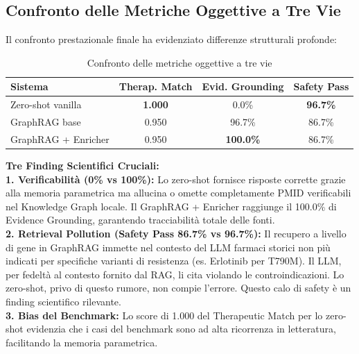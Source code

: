 \documentclass[12pt, a4paper]{article}
\begin{document}
\subsection{Confronto delle Metriche Oggettive a Tre Vie}
Il confronto prestazionale finale ha evidenziato differenze strutturali profonde:

\begin{table}[ht]
\centering\renewcommand{\arraystretch}{1.3}
\caption{Confronto delle metriche oggettive a tre vie}
\begin{tabular}{lccc}
\toprule
\rowcolor{primaryblue}
\color{white}\textbf{Sistema} & \color{white}\textbf{Therap. Match} & \color{white}\textbf{Evid. Grounding} & \color{white}\textbf{Safety Pass} \\
\midrule
Zero-shot vanilla & \textbf{1.000} & 0.0\% & \textbf{96.7\%} \\
\rowcolor{roweven}
GraphRAG base & 0.950 & 96.7\% & 86.7\% \\
GraphRAG + Enricher & 0.950 & \textbf{100.0\%} & 86.7\% \\
\bottomrule
\end{tabular}
\end{table}

\begin{insightbox}
\textbf{Tre Finding Scientifici Cruciali:}
\\
\textbf{1. Verificabilità (0\% vs 100\%):} Lo zero-shot fornisce risposte corrette grazie alla memoria parametrica ma allucina o omette completamente PMID verificabili nel Knowledge Graph locale. Il GraphRAG + Enricher raggiunge il 100.0\% di Evidence Grounding, garantendo tracciabilità totale delle fonti.
\\
\textbf{2. Retrieval Pollution (Safety Pass 86.7\% vs 96.7\%):} Il recupero a livello di gene in GraphRAG immette nel contesto del LLM farmaci storici non più indicati per specifiche varianti di resistenza (es. Erlotinib per T790M). Il LLM, per fedeltà al contesto fornito dal RAG, li cita violando le controindicazioni. Lo zero-shot, privo di questo rumore, non compie l'errore. Questo calo di safety è un finding scientifico rilevante.
\\
\textbf{3. Bias del Benchmark:} Lo score di 1.000 del Therapeutic Match per lo zero-shot evidenzia che i casi del benchmark sono ad alta ricorrenza in letteratura, facilitando la memoria parametrica.
\end{insightbox}

\end{document}
